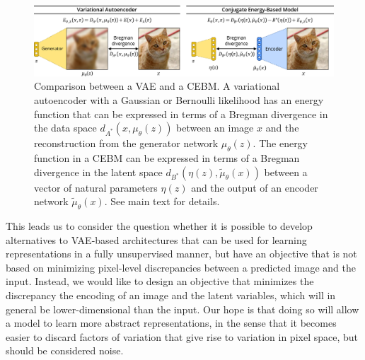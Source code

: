 \documentclass{article}
\begin{document}
\begin{figure}[!t]
\centering
\includegraphics[width=\textwidth]{figures/cebm_overview_v5.pdf}
\vspace*{-4.5ex}
\caption{Comparison between a VAE and a CEBM. A variational autoencoder with a Gaussian or Bernoulli likelihood has an energy function that can be expressed in terms of a Bregman divergence in the data space $d_{A^*}(x, \mu_\theta(z))$ between an image $x$ and the reconstruction from the generator network $\mu_\theta(z)$. The energy function in a CEBM can be expressed in terms of a Bregman divergence in the latent space $d_{B^*}(\eta(z), \tilde{\mu}_\theta(x))$ between a vector of natural parameters $\eta(z)$ and the output of an encoder network $\tilde{\mu}_\theta(x)$. See main text for details.}
\vspace*{-2.5ex}
\label{fig:overview}
\end{figure}



This leads us to consider the question whether it is possible to develop alternatives to VAE-based architectures that can be used for learning representations in a fully unsupervised manner, but have an objective that is not based on minimizing  pixel-level discrepancies between a predicted image and the input. Instead, we would like to design an objective that minimizes the discrepancy the encoding of an image and the latent variables, which will in general be lower-dimensional than the input. Our hope is that doing so will allow a model to learn more abstract representations, in the sense that it becomes easier to discard factors of variation that give rise to variation in pixel space, but should be considered noise.
\end{document}

